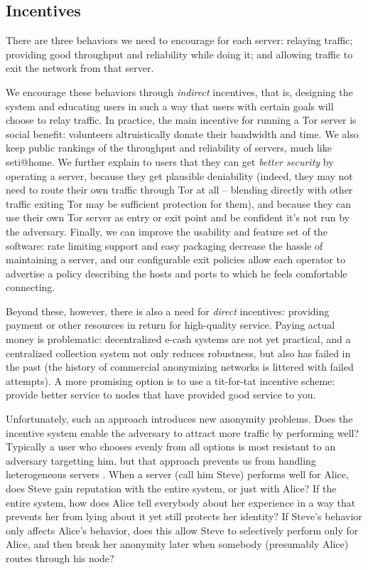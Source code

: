 \documentclass{llncs}
\begin{document}
\subsection{Incentives}

There are three behaviors we need to encourage for each server: relaying
traffic; providing good throughput and reliability while doing it;
and allowing traffic to exit the network from that server.

We encourage these behaviors through \emph{indirect} incentives, that
is, designing the system and educating users in such a way that users
with certain goals will choose to relay traffic.  In practice, the
main incentive for running a Tor server is social benefit: volunteers
altruistically donate their bandwidth and time.  We also keep public
rankings of the throughput and reliability of servers, much like
seti@home.  We further explain to users that they can get \emph{better
security} by operating a server, because they get plausible deniability
(indeed, they may not need to route their own traffic through Tor at all
-- blending directly with other traffic exiting Tor may be sufficient
protection for them), and because they can use their own Tor server
as entry or exit point and be confident it's not run by the adversary.
Finally, we can improve the usability and feature set of the software:
rate limiting support and easy packaging decrease the hassle of
maintaining a server, and our configurable exit policies allow each
operator to advertise a policy describing the hosts and ports to which
he feels comfortable connecting.

Beyond these, however, there is also a need for \emph{direct} incentives:
providing payment or other resources in return for high-quality service.
Paying actual money is problematic: decentralized e-cash systems are
not yet practical, and a centralized collection system not only reduces
robustness, but also has failed in the past (the history of commercial
anonymizing networks is littered with failed attempts).  A more promising
option is to use a tit-for-tat incentive scheme: provide better service
to nodes that have provided good service to you.

Unfortunately, such an approach introduces new anonymity problems.
Does the incentive system enable the adversary to attract more traffic by
performing well? Typically a user who chooses evenly from all options is
most resistant to an adversary targetting him, but that approach prevents
us from handling heterogeneous servers \cite{casc-rep}.
When a server (call him Steve) performs well for Alice, does Steve gain
reputation with the entire system, or just with Alice? If the entire
system, how does Alice tell everybody about her experience in a way that
prevents her from lying about it yet still protects her identity? If
Steve's behavior only affects Alice's behavior, does this allow Steve to
selectively perform only for Alice, and then break her anonymity later
when somebody (presumably Alice) routes through his node?
\end{document}

